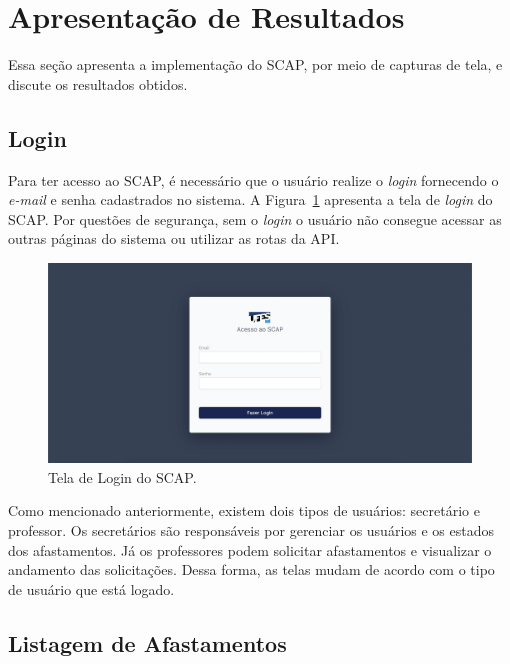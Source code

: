 

\section{Apresentação de Resultados}
\label{sec-projeto-impl}

Essa seção apresenta a implementação do SCAP, por meio de capturas de tela,
e discute os resultados obtidos.

\subsection{Login}
\label{subsec-projeto-login}

Para ter acesso ao SCAP, é necessário que o usuário realize o \textit{login} fornecendo o \textit{e-mail}
e senha cadastrados no sistema. A Figura~\ref{fig-login} apresenta a tela de \textit{login} do SCAP.
Por questões de segurança, sem o \textit{login} o usuário não consegue acessar as outras páginas do sistema
ou utilizar as rotas da API.

\begin{figure}[h!]
    \centering
    \includegraphics[width=\textwidth]{figuras/prints-app/fig-login.png}
    \caption{Tela de Login do SCAP.}
    \label{fig-login}
\end{figure}

Como mencionado anteriormente, existem dois tipos de usuários: secretário e professor. 
Os secretários são responsáveis por gerenciar os usuários e os estados dos afastamentos.
Já os professores podem solicitar afastamentos e visualizar o andamento das solicitações.
Dessa forma, as telas mudam de acordo com o tipo de usuário que está logado.



\subsection{Listagem de Afastamentos}
\label{subsec-projeto-afastamentos}


